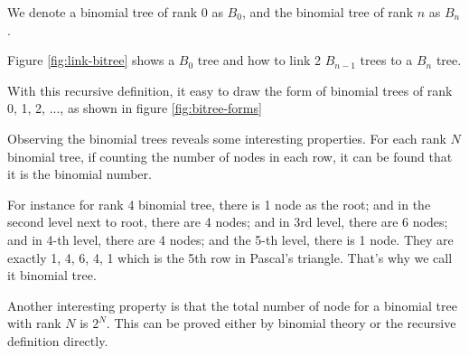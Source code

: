 \documentclass{article}
\begin{document}
We denote a binomial tree of rank 0 as $B_0$, and the binomial tree of rank
$n$ as $B_n$.

Figure \ref{fig:link-bitree} shows a $B_0$ tree and how to link 2 $B_{n-1}$
trees to a $B_n$ tree.


With this recursive definition, it easy to draw the form of binomial trees
of rank 0, 1, 2, ..., as shown in figure \ref{fig:bitree-forms}


Observing the binomial trees reveals some interesting properties. For each rank $N$ binomial tree, if counting the number of nodes in each row, it can be found that it is the binomial number.

For instance for rank 4 binomial tree, there is 1 node as the root; and in the second level next to root, there are 4 nodes; and in 3rd level, there are 6 nodes; and in 4-th level, there are 4 nodes; and the 5-th level, there is 1 node. They are exactly 1, 4, 6, 4, 1 which is the 5th row in Pascal's triangle. That's why we call it binomial tree.

Another interesting property is that the total number of node for a binomial tree with rank $N$ is $2^N$. This can be proved either by binomial theory or the recursive definition directly.
\end{document}
